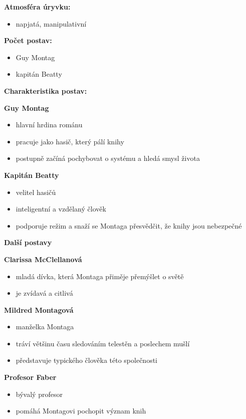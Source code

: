 \documentclass[12pt,a4paper]{article}
\begin{document}
\begin{tcolorbox}[breakable]

\textbf{Atmosféra úryvku:}
\begin{itemize}
\item napjatá, manipulativní
\end{itemize}

\textbf{Počet postav:}
\begin{itemize}
\item Guy Montag
\item kapitán Beatty
\end{itemize}

\textbf{Charakteristika postav:}

\textbf{Guy Montag}
\begin{itemize}
\item hlavní hrdina románu
\item pracuje jako hasič, který pálí knihy
\item postupně začíná pochybovat o systému a hledá smysl života
\end{itemize}

\textbf{Kapitán Beatty}
\begin{itemize}
\item velitel hasičů
\item inteligentní a vzdělaný člověk
\item podporuje režim a snaží se Montaga přesvědčit, že knihy jsou nebezpečné
\end{itemize}

\textbf{Další postavy}

\textbf{Clarissa McClellanová}
\begin{itemize}
\item mladá dívka, která Montaga přiměje přemýšlet o světě
\item je zvídavá a citlivá
\end{itemize}

\textbf{Mildred Montagová}
\begin{itemize}
\item manželka Montaga
\item tráví většinu času sledováním telestěn a poslechem mušlí
\item představuje typického člověka této společnosti
\end{itemize}

\textbf{Profesor Faber}
\begin{itemize}
\item bývalý profesor
\item pomáhá Montagovi pochopit význam knih
\end{itemize}


\end{tcolorbox}
\end{document}
